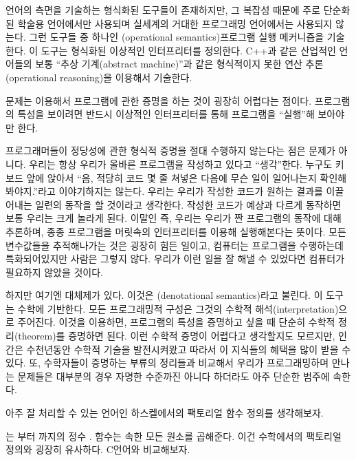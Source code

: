 언어의  측면을 기술하는 형식화된 도구들이 존재하지만, 그 복잡성 때문에 주로 단순화된 학술용 언어에서만 사용되며 실세계의 거대한 프로그래밍 언어에서는 사용되지 않는다.
그런 도구들 중 하나인 \newterm{\trOperationalSemantics}(operational semantics)\는 프로그램 실행 메커니즘을 기술한다. 이 도구는 형식화된 이상적인 인터프리터를 정의한다.
C++과 같은 산업적인 언어들의 \trSemantics\는 보통 ``추상 기계(abstract machine)''과 같은 형식적이지 못한 연산 추론(operational reasoning)을 이용해서 기술한다.

문제는 \trOperationalSemantics\를 이용해서 프로그램에 관한 증명을 하는 것이 굉장히 어렵다는 점이다. 프로그램의 특성을 보이려면 반드시 이상적인 인터프리터를 통해 프로그램을 ``실행''해 보아야만 한다.

프로그래머들이 정당성에 관한 형식적 증명을 절대 수행하지 않는다는 점은 문제가 아니다. 우리는 항상 우리가 올바른 프로그램을 작성하고 있다고 ``생각''한다.
누구도 키보드 앞에 앉아서 ``음, 적당히 코드 몇 줄 쳐넣은 다음에 무슨 일이 일어나는지 확인해봐야지.''라고 이야기하지는 않는다.
우리는 우리가 작성한 코드가 원하는 결과를 이끌어내는 일련의 동작을 할 것이라고 생각한다. 작성한 코드가 예상과 다르게 동작하면 보통 우리는 크게 놀라게 된다.
이말인 즉, 우리는 우리가 짠 프로그램의 동작에 대해 추론하며, 종종 프로그램을 머릿속의 인터프리터를 이용해 실행해본다는 뜻이다.
모든 변수값들을 추적해나가는 것은 굉장히 힘든 일이고, 컴퓨터는 프로그램을 수행하는데 특화되어있지만 사람은 그렇지 않다.
우리가 이런 일을 잘 해낼 수 있었다면 컴퓨터가 필요하지 않았을 것이다.

하지만 여기엔 대체제가 있다. 이것은 \newterm{\trDenotationalSemantics}(denotational semantics)라고 불린다. 이 도구는 수학에 기반한다.
 모든 프로그래밍적 구성은 그것의 수학적 해석(interpretation)으로 주어진다.
이것을 이용하면, 프로그램의 특성을 증명하고 싶을 때 단순히 수학적 정리(theorem)를 증명하면 된다.
이런 수학적 증명이 어렵다고 생각할지도 모르지만, 인간은 수천년동안 수학적 기술을 발전시켜왔고 따라서 이 지식들의 혜택을 많이 받을 수 있다.
또, 수학자들이 증명하는 부류의 정리들과 비교해서 우리가 프로그래밍하며 만나는 문제들은 대부분의 경우 자명한 수준까진 아니다 하더라도 아주 단순한 범주에 속한다.

 아주 잘 처리할 수 있는 언어인 하스켈에서의 팩토리얼 함수 정의를 생각해보자. 


\trExpression \code{{[}1..n{]}} 는  부터 까지의 정수 \trList{}.   함수는  속한 모든 원소를 곱해준다. 이건 수학에서의 팩토리얼 정의와 굉장히 유사하다. C언어와 비교해보자.

